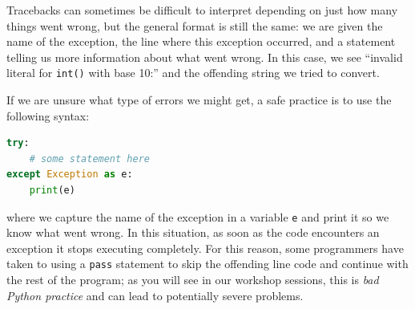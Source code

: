 \documentclass{tufte-book}
\begin{document}
Tracebacks can sometimes be difficult to interpret depending on just how many things went wrong, but the general format is still the same: we are given the name of the exception, the line where this exception occurred, and a statement telling us more information about what went wrong. In this case, we see ``invalid literal for \verb|int()| with base 10:'' and the offending string we tried to convert. 

If we are unsure what type of errors we might get, a safe practice is to use the following syntax:

\begin{lstlisting}[language=Python, showstringspaces=false,backgroundcolor=\color{lightgray}]
try:
    # some statement here
except Exception as e:
    print(e)
\end{lstlisting}

\noindent where we capture the name of the exception in a variable \verb|e| and print it so we know what went wrong. In this situation, as soon as the code encounters an exception it stops executing completely. For this reason, some programmers have taken to using a \verb|pass| statement to skip the offending line code and continue with the rest of the program; as you will see in our workshop sessions, this is \textit{bad Python practice} and can lead to potentially severe problems.






\end{document}
